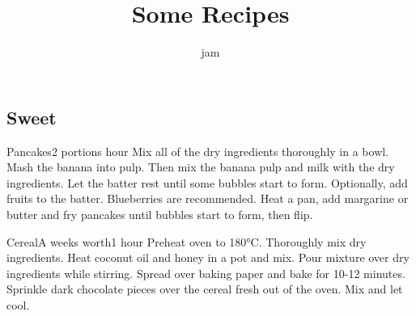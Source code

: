 \documentclass[]{article}
\title{Some Recipes}
\author{jam}
\begin{document}
\renewcommand*{\recipetitlefont}{\large\bfseries\sffamily}
\renewcommand*{\recipenumberfont}{\large\bfseries\sffamily}
\renewcommand*{\recipequantityfont}{\sffamily\bfseries}
\renewcommand*{\recipeunitfont}{\sffamily}
\renewcommand*{\recipeingredientfont}{\sffamily}
\renewcommand*{\recipefreeformfont}{\itshape}

\maketitle

\tableofcontents
\newpage
\begin{center}
	
	\section{Sweet}
	
	\begin{recipe}{Pancakes}{2 portions}{ hour}
		Mix all of the dry ingredients thoroughly in a bowl.
		Mash the banana into pulp.
		Then mix the banana pulp and milk with the dry ingredients.
		Let the batter rest until some bubbles start to form.
		Optionally, add fruits to the batter.
		Blueberries are recommended.
		\freeform Heat a pan, add margarine or butter and fry pancakes until bubbles start to form, then flip.
		\freeform\hrulefill
	\end{recipe}
	
	\begin{recipe}{Cereal}{A weeks worth}{1 hour}
		Preheat oven to 180°C.
		Thoroughly mix dry ingredients.
		Heat coconut oil and honey in a pot and mix.
		Pour mixture over dry ingredients while stirring.
		\newstep
		Spread over baking paper and bake for 10-12 minutes.
		Sprinkle dark chocolate pieces over the cereal fresh out of the oven.
		Mix and let cool.
		\freeform\hrulefill
	\end{recipe}
	

\end{center}
\end{document}
